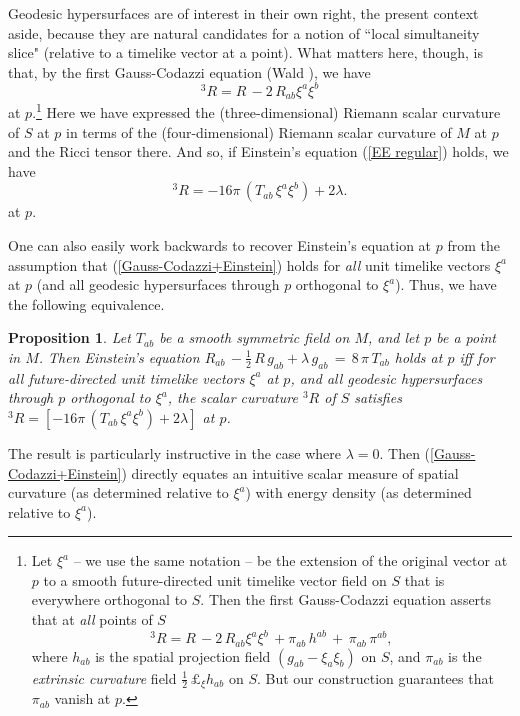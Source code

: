 \documentclass [12] {article}
\theoremstyle{plain}
\newtheorem{proposition}{Proposition}[subsection]
\numberwithin{figure}{subsection}
\numberwithin{proposition}{subsection}
\begin{document}
Geodesic hypersurfaces are of interest in their own right, the present context aside, because they are natural candidates for a notion of ``local simultaneity slice" (relative to a timelike vector at a point). 
What matters here, though,  is that, by the first Gauss-Codazzi equation (Wald ), we have
%
\begin{equation} \label{first contraction Gauss-Codazzi}
{}^3R =  R \,  -2 \, R_{ab}  \xi^a  \xi^b 
\end{equation}
%
at $p$.\footnote{Let $\xi^a$ -- we use the same notation -- be the extension of the original vector at $p$ to a smooth future-directed unit timelike vector field on $S$ that is everywhere orthogonal to $S$. Then the first Gauss-Codazzi equation asserts that at \emph{all} points of $S$ 
%
\begin{equation*} 
{}^3R =  R \,  -2 \, R_{ab}  \xi^a  \xi^b \, + \pi_{ab}\, h^{ab}\,  + \,  \pi_{ab}\, \pi^{ab}, 
\end{equation*}
%
where $h_{ab}$ is the spatial projection field  $(g_{ab} - \xi_a \xi_b)$  on $S$, and $\pi_{ab}$ is the \emph{extrinsic curvature} field  $\frac{1}{2} \, \pounds_{\xi} h_{ab}$ on $S$.  But our construction guarantees that $\pi_{ab}$ vanish at $p$.} Here we have expressed the (three-dimensional) Riemann scalar curvature of $S$ at $p$ in terms of the (four-dimensional)  Riemann scalar curvature of $M$ at $p$ and the Ricci tensor there.  And so, if Einstein's equation  (\ref{EE regular}) holds, we have
%
\begin{equation} \label{Gauss-Codazzi+Einstein}
 {}^3R =  -16 \pi \,(T_{ab}\, \xi^a \xi^b) + 2 \lambda.  
\end{equation}
%
at $p$.

One can also easily work backwards to recover Einstein's equation at $p$ from the assumption that  (\ref{Gauss-Codazzi+Einstein}) holds for \emph{all} unit timelike vectors $\xi^a$ at $p$ (and all geodesic hypersurfaces through $p$ orthogonal to $\xi^a$). Thus, we have the following equivalence.

\begin{proposition} \label{E equivalent prop} 
Let $T_{ab}$ be a smooth symmetric field on $M$, and let $p$ be a point in $M$. Then Einstein's equation
$R_{ab} \,  - \frac{1}{2} \, R \, g_{ab}   + \lambda \, g_{ab} \,  = \,  8 \, \pi \, T_{ab}$
holds at $p$ iff for all future-directed unit timelike vectors $\xi^a$ at $p$, and all  geodesic hypersurfaces through $p$ orthogonal to $\xi^a$,  the scalar curvature ${}^3R$ of $S$ satisfies 
$ {}^3R =  [-16 \pi \,(T_{ab}\, \xi^a \xi^b) + 2 \lambda]$ at $p$.
\end{proposition}
The result is particularly instructive in the case where $\lambda = 0$. Then (\ref{Gauss-Codazzi+Einstein}) directly equates an intuitive scalar measure of spatial curvature (as determined relative to $\xi^a$) with energy density (as determined relative to $\xi^a$).  
\end{document}
